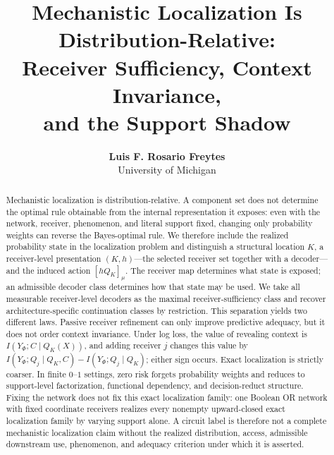 \documentclass{article}
\title{Mechanistic Localization Is\\
Distribution-Relative:\\
Receiver Sufficiency, Context Invariance,\\
and the Support Shadow}
\author{\textbf{Luis F. Rosario Freytes}\\University of Michigan}
\begin{document}
\maketitle

\begin{abstract}
Mechanistic localization is distribution-relative. A component set does not determine the optimal rule obtainable from the internal representation it exposes: even with the network, receiver, phenomenon, and literal support fixed, changing only probability weights can reverse the Bayes-optimal rule. We therefore include the realized probability state in the localization problem and distinguish a structural location $K$, a receiver-level presentation $(K,h)$---the selected receiver set together with a decoder---and the induced action $[hQ_K]_\mu$. The receiver map determines what state is exposed; an admissible decoder class determines how that state may be used. We take all measurable receiver-level decoders as the maximal receiver-sufficiency class and recover architecture-specific continuation classes by restriction. This separation yields two different laws. Passive receiver refinement can only improve predictive adequacy, but it does not order context invariance. Under log loss, the value of revealing context is $I(Y_\Phi;C\mid Q_K(X))$, and adding receiver $j$ changes this value by $I(Y_\Phi;Q_j\mid Q_K,C)-I(Y_\Phi;Q_j\mid Q_K)$; either sign occurs. Exact localization is strictly coarser. In finite $0$--$1$ settings, zero risk forgets probability weights and reduces to support-level factorization, functional dependency, and decision-reduct structure. Fixing the network does not fix this exact localization family: one Boolean OR network with fixed coordinate receivers realizes every nonempty upward-closed exact localization family by varying support alone. A circuit label is therefore not a complete mechanistic localization claim without the realized distribution, access, admissible downstream use, phenomenon, and adequacy criterion under which it is asserted.
\end{abstract}






\end{document}
